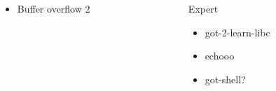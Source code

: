 \documentclass[aspectratio=169]{beamer}
\begin{document}
\begin{frame}
\begin{columns}[T]
\begin{column}{0.5\textwidth}
\begin{itemize}
                \item Buffer overflow 2
            \end{itemize}
        \end{column}
        \begin{column}{0.5\textwidth}
            Expert
            \begin{itemize}
                \item got-2-learn-libc
                \item echooo
                \item got-shell?
            \end{itemize}
        \end{column}
    \end{columns}
\end{frame}
\end{document}
